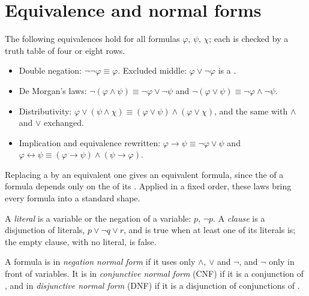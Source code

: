 \section{Equivalence and normal forms}\label{sec:b1:propositional-logic:normal-forms}

The following equivalences hold for all formulas $\varphi$, $\psi$, $\chi$; each is checked by a truth table of
four or eight rows.
\begin{itemize}
\item Double negation: $\neg\neg\varphi \equiv \varphi$. Excluded middle: $\varphi \vee \neg\varphi$ is a .
\item De Morgan's laws: $\neg(\varphi \wedge \psi) \equiv \neg\varphi \vee \neg\psi$ and $\neg(\varphi \vee \psi) \equiv
\neg\varphi \wedge \neg\psi$.
\item Distributivity: $\varphi \vee (\psi \wedge \chi) \equiv (\varphi \vee \psi) \wedge (\varphi \vee \chi)$, and the
same with $\wedge$ and $\vee$ exchanged.
\item Implication and equivalence rewritten: $\varphi \rightarrow \psi \equiv \neg\varphi \vee \psi$ and $\varphi
\leftrightarrow \psi \equiv (\varphi \rightarrow \psi) \wedge (\psi \rightarrow \varphi)$.
\end{itemize}
Replacing a  by an equivalent one gives an equivalent formula, since the  of a formula depends
only on the  of its . Applied in a fixed order, these laws bring every formula into a standard
shape.

\begin{definition}\label{def:b1:propositional-logic:literal}
A \emph{literal} is a variable or the negation of a variable: $p$, $\neg p$. A
\emph{clause} is a disjunction of literals, $p \vee \neg q \vee r$, and is true when at least one of its
literals is; the empty clause, with no literal, is false.
\end{definition}

\begin{definition}\label{def:b1:propositional-logic:normal-forms}
A formula is in \emph{negation normal form} if it uses only $\wedge$, $\vee$ and $\neg$,
and $\neg$ only in front of variables. It is in \emph{conjunctive normal form} (CNF) if
it is a conjunction of , and in \emph{disjunctive normal form} (DNF) if it is a
disjunction of conjunctions of .
\end{definition}

